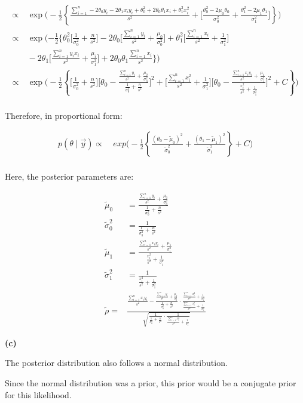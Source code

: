 \documentclass[11pt]{article}
\renewcommand\part[1]{\vspace{.10in}\textbf{(#1)}}
\begin{document}
$$
\begin{aligned}
\propto&\ \exp\Biggl(-\frac{1}{2} \left\{
\frac{\sum_{i=1}^{n} -2\theta_0y_i - 2\theta_1x_iy_i+\theta_0^2+2\theta_0\theta_1x_i+\theta_1^2x_i^2}{s^2}
+\Biggl[\frac{\theta_0^2-2\mu_0\theta_0}{\sigma_0^2} + \frac{\theta_1^2-2\mu_1\theta_1}{\sigma_1^2}\Biggr]
\right\}
\Biggr)\\
\propto&\ \exp(-\frac{1}{2} \{
\theta_0^2\Biggl[\frac{1}{\sigma^2_0}+\frac{n}{s^2}\Biggr] - 2\theta_0\Biggl[\frac{\sum_{i=1}^{n}y_i}{s^2} + \frac{\mu_0}{\sigma_0^2}\Biggr]
+ \theta_1^2\Biggl[\frac{\sum_{i=1}^{n}x_i}{s^2} + \frac{1}{\sigma_1^2}\Biggr] \\ 
\ & \ - 2\theta_1\Biggl[\frac{\sum_{i=1}^{n}y_ix_i}{s^2} + \frac{\mu_i}{\sigma_1^2}\Biggr]
+ 2\theta_0\theta_1\frac{\sum_{i=1}^{n}x_i}{s^2}
\}
)\\
\propto&\ \exp\Biggl(-\frac{1}{2} \left\{
\Biggl[\frac{1}{\sigma_0^2}+\frac{n}{s^2}\Biggr]
\Biggl[\theta_0-
\frac{\frac{\sum_{i=1}^n y_i}{s^2} + \frac{\mu_0}{\sigma_0^2}}{\frac{1}{\sigma_0^2}+\frac{n}{s^2}}\Biggr]^2
+
\Biggl[\frac{\sum_{i=1}^n x_i^2}{s^2}+\frac{1}{\sigma_1^2}\Biggr]
\Biggl[\theta_0-
\frac{\frac{\sum_{i=1}^n x_iy_i}{s^2} + \frac{\mu_1}{\sigma_1^2}}{\frac{x_i^2}{s^2}+\frac{1}{\sigma_1^2}}\Biggr]^2 + C
\right\}\Biggr)\\
\end{aligned}
$$

Therefore, in proportional form:

$$
\begin{aligned}
p(\theta \mid \vec{y}) \propto&\  exp\Biggl(-\frac{1}{2} \left\{\frac{(\theta_0-\tilde{\mu}_0)^2}{\tilde{\sigma}_0^2}
+
\frac{(\theta_1-\tilde{\mu}_1)^2}{\tilde{\sigma}_1^2}
\right\} + C\Biggr)\\
\end{aligned}
$$

Here, the posterior parameters are:

$$
\begin{aligned}
\tilde{\mu}_0 &= \frac{\frac{\sum_{i=1}^n y_i}{s^2} + \frac{\mu_0}{\sigma_0^2}}{\frac{1}{\sigma_0^2}+\frac{n}{s^2}} \\
\tilde{\sigma}_0^2 &= \frac{1}{\frac{1}{\sigma_0^2}+\frac{n}{s^2}} \\
\tilde{\mu}_1 &= \frac{\frac{\sum_{i=1}^n x_iy_i}{s^2} + \frac{\mu_1}{\sigma_1^2}}{\frac{x_i^2}{s^2}+\frac{1}{\sigma_1^2}} \\
\tilde{\sigma}_1^2 &= \frac{1}{\frac{x_i^2}{s^2}+\frac{1}{\sigma_1^2}}\\
\tilde{\rho} =& \frac{\frac{\sum_{i=1}^n x_iy_i}{s^2} - \frac{\frac{\sum_{i=1}^n y_i}{s^2} + \frac{\mu_0}{\sigma_0^2}}{\frac{1}{\sigma_0^2}+\frac{n}{s^2}} \cdot \frac{\frac{\sum_{i=1}^n x_i^2}{s^2} + \frac{1}{\sigma_1^2}}{\frac{\sum_{i=1}^n x_i^2}{s^2}+\frac{1}{\sigma_1^2}}}{\sqrt{\frac{1}{\frac{1}{\sigma_0^2}+\frac{n}{s^2}} \cdot \frac{1}{\frac{\sum_{i=1}^n x_i^2}{s^2}+\frac{1}{\sigma_1^2}}}}
\end{aligned}
$$

\part{c}

The posterior distribution also follows a normal distribution.

Since the normal distribution was a prior, this prior would be
a conjugate prior for this likelihood.
\end{document}
